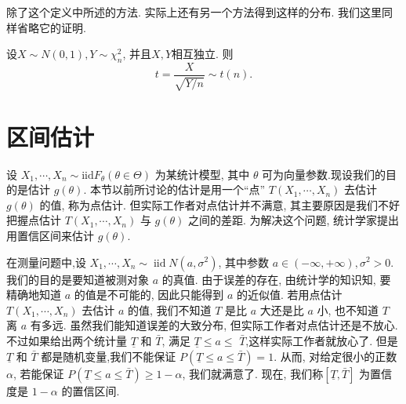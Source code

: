 除了这个定义中所述的方法. 实际上还有另一个方法得到这样的分布. 我们这里同样省略它的证明. 

\begin{theorem}
    设$X\sim N(0, 1), Y\sim \chi^2_n$, 并且$X, Y$相互独立. 则
    $$
    t=\frac{X}{\sqrt{Y/n}} \sim t(n).
    $$
\end{theorem}

\section{区间估计}

设 $X_1, \cdots, X_n \sim \mathrm{iid} F_\theta(\theta \in \Theta)$ 为某统计模型, 其中 $\theta$ 可为向量参数.现设我们的目的是估计 $g(\theta)$. 本节以前所讨论的估计是用一个“点” $T\left(X_1, \cdots, X_n\right)$ 去估计 $g(\theta)$ 的值, 称为点估计. 但实际工作者对点估计并不满意, 其主要原因是我们不好把握点估计 $T\left(X_1, \cdots, X_n\right)$ 与 $g(\theta)$ 之间的差距. 为解决这个问题, 统计学家提出用置信区间来估计 $g(\theta)$. 

\begin{example}
    在测量问题中,设 $X_1, \cdots, X_n \sim \operatorname{iid} N\left(a, \sigma^2\right)$, 其中参数 $a \in(-\infty,+\infty), \sigma^2>0$. 我们的目的是要知道被测对象 $a$ 的真值. 由于误差的存在, 由统计学的知识知, 要精确地知道 $a$ 的值是不可能的, 因此只能得到 $a$ 的近似值. 若用点估计 $T\left(X_1, \cdots, X_n\right)$ 去估计 $a$ 的值, 我们不知道 $T$ 是比 $a$ 大还是比 $a$ 小, 也不知道 $T$ 离 $a$ 有多远. 虽然我们能知道误差的大致分布, 但实际工作者对点估计还是不放心. 不过如果给出两个统计量 $\underline T$ 和 $\bar{T}$, 满足 $\underline T \leqslant a \leqslant$ $\bar{T}$,这样实际工作者就放心了. 但是 $\underline{T}$ 和 $\bar{T}$ 都是随机变量,我们不能保证 $P(\underline{T} \leqslant a \leqslant \bar{T})=1$. 从而, 对给定很小的正数 $\alpha$, 若能保证 $P(\underline{T} \leqslant a \leqslant \bar T)\geq 1-\alpha $, 我们就满意了. 现在, 我们称$[\underline T, \bar{T}]$ 为置信度是 $1-\alpha$ 的置信区间.
\end{example}

